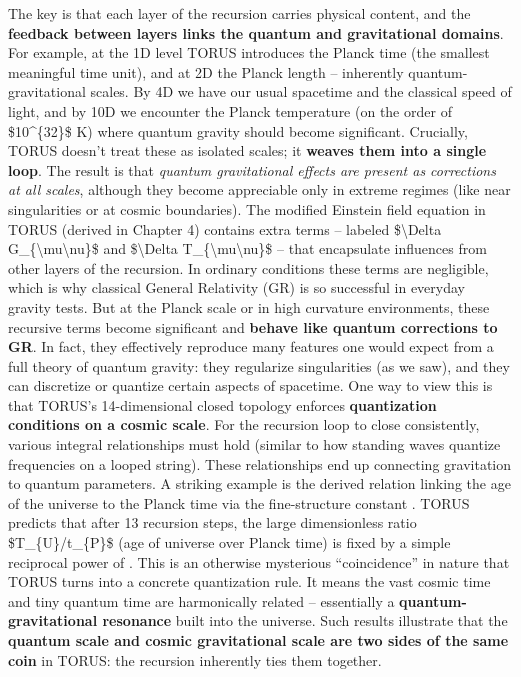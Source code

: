\documentclass[
]{article}
\begin{document}
{The key is that each layer of the recursion carries physical content,
and the \textbf{feedback between layers links the quantum and
gravitational domains}. For example, at the 1D level TORUS introduces
the Planck time (the smallest meaningful time unit), and at 2D the
Planck length -- inherently quantum-gravitational scales. By 4D we have
our usual spacetime and the classical speed of light, and by 10D we
encounter the Planck temperature (on the order of \$10\^{}\{32\}\$ K)
where quantum gravity should become significant. Crucially, TORUS
doesn't treat these as isolated scales; it \textbf{weaves them into a
single loop}. The result is that \emph{quantum gravitational effects are
present as corrections at all scales}, although they become appreciable
only in extreme regimes (like near singularities or at cosmic
boundaries). The modified Einstein field equation in TORUS (derived in
Chapter 4) contains extra terms -- labeled \$\textbackslash Delta
G\_\{\textbackslash mu\textbackslash nu\}\$ and \$\textbackslash Delta
T\_\{\textbackslash mu\textbackslash nu\}\$ -- that encapsulate
influences from other layers of the recursion\hspace{0pt}. In ordinary
conditions these terms are negligible, which is why classical General
Relativity (GR) is so successful in everyday gravity tests. But at the
Planck scale or in high curvature environments, these recursive terms
become significant and \textbf{behave like quantum corrections to GR}.
In fact, they effectively reproduce many features one would expect from
a full theory of quantum gravity: they regularize singularities (as we
saw), and they can discretize or quantize certain aspects of spacetime.
One way to view this is that TORUS's 14-dimensional closed topology
enforces \textbf{quantization conditions on a cosmic scale}. For the
recursion loop to close consistently, various integral relationships
must hold (similar to how standing waves quantize frequencies on a
looped string). These relationships end up connecting gravitation to
quantum parameters. A striking example is the derived relation linking
the age of the universe to the Planck time via the fine-structure
constant \alpha. TORUS predicts that after 13 recursion steps, the large
dimensionless ratio \$T\_\{U\}/t\_\{P\}\$ (age of universe over Planck
time) is fixed by a simple reciprocal power of \alpha\hspace{0pt}. This is an
otherwise mysterious ``coincidence'' in nature that TORUS turns into a
concrete quantization rule. It means the vast cosmic time and tiny
quantum time are harmonically related -- essentially a
\textbf{quantum-gravitational resonance} built into the universe. Such
results illustrate that the \textbf{quantum scale and cosmic
gravitational scale are two sides of the same coin} in TORUS: the
recursion inherently ties them together.

}
\end{document}
